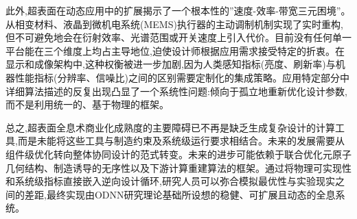 此外,超表面在动态应用中的扩展揭示了一个根本性的''速度-效率-带宽三元困境''。从相变材料、液晶到微机电系统(MEMS)执行器的主动调制机制实现了实时重构,但不可避免地会在衍射效率、光谱范围或开关速度上引入代价。目前没有任何单一平台能在三个维度上均占主导地位,迫使设计师根据应用需求接受特定的折衷。在显示和成像架构中,这种权衡被进一步加剧,因为人类感知指标(亮度、刷新率)与机器性能指标(分辨率、信噪比)之间的区别需要定制化的集成策略。应用特定部分中详细算法描述的反复出现凸显了一个系统性问题:倾向于孤立地重新优化设计参数,而不是利用统一的、基于物理的框架。

总之,超表面全息术商业化成熟度的主要障碍已不再是缺乏生成复杂设计的计算工具,而是未能将这些工具与制造约束及系统级运行要求相结合。未来的发展需要从组件级优化转向整体协同设计的范式转变。未来的进步可能依赖于联合优化元原子几何结构、制造诱导的无序性以及下游计算重建算法的框架。通过将物理可实现性和系统级指标直接嵌入逆向设计循环,研究人员可以弥合模拟最优性与实验现实之间的差距,最终实现由ODNN研究理论基础所设想的稳健、可扩展且动态的全息系统。
